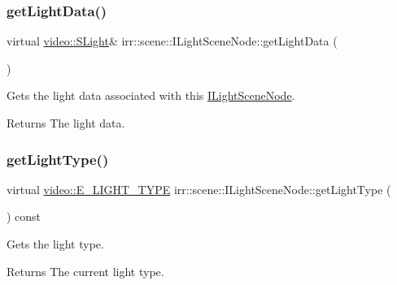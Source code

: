 \subsubsection{\texorpdfstring{get\+Light\+Data()}{getLightData()}\hspace{0.1cm}{\footnotesize\ttfamily [4/4]}}
{\footnotesize\ttfamily virtual \hyperlink{structirr_1_1video_1_1SLight}{video\+::\+S\+Light}\& irr\+::scene\+::\+I\+Light\+Scene\+Node\+::get\+Light\+Data (\begin{DoxyParamCaption}{ }\end{DoxyParamCaption})\hspace{0.3cm}{\ttfamily [pure virtual]}}



Gets the light data associated with this \hyperlink{classirr_1_1scene_1_1ILightSceneNode}{I\+Light\+Scene\+Node}. 

\begin{DoxyReturn}{Returns}
The light data. 
\end{DoxyReturn}
\mbox{\label{classirr_1_1scene_1_1ILightSceneNode_a47e327388c75391ebc910369af7eedce}} 
\subsubsection{\texorpdfstring{get\+Light\+Type()}{getLightType()}\hspace{0.1cm}{\footnotesize\ttfamily [1/2]}}
{\footnotesize\ttfamily virtual \hyperlink{namespaceirr_1_1video_aaf0e02f6f83cc35cf9e764bf18400d39}{video\+::\+E\+\_\+\+L\+I\+G\+H\+T\+\_\+\+T\+Y\+PE} irr\+::scene\+::\+I\+Light\+Scene\+Node\+::get\+Light\+Type (\begin{DoxyParamCaption}{ }\end{DoxyParamCaption}) const\hspace{0.3cm}{\ttfamily [pure virtual]}}



Gets the light type. 

\begin{DoxyReturn}{Returns}
The current light type. 
\end{DoxyReturn}
\mbox{\label{classirr_1_1scene_1_1ILightSceneNode_a47e327388c75391ebc910369af7eedce}} 
